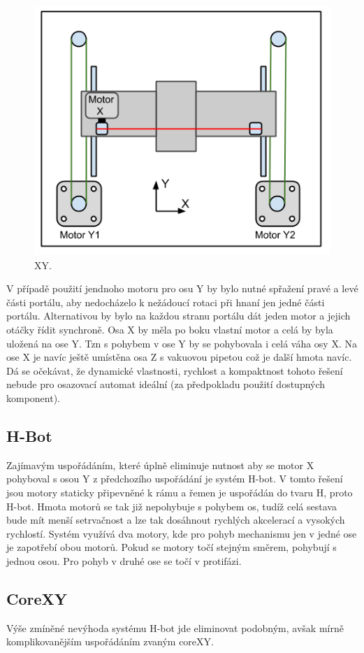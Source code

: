 \begin{figure}[h!]
  \centering
    \includegraphics[width=0.6\linewidth]{obrazky/XY.png}%
    \caption{XY.}
    \label{fig:XY}
\end{figure}


V případě použití jendnoho motoru pro osu Y by bylo nutné spřažení pravé a levé části portálu, aby nedocházelo k nežádoucí rotaci při hnaní jen jedné části portálu. Alternativou by bylo na každou stranu portálu dát jeden motor a jejich otáčky řídit synchroně. 
Osa X by měla po boku vlastní motor a celá by byla uložená na ose Y. Tzn s pohybem v ose Y by se pohybovala i celá váha osy X. Na ose X je navíc ještě umístěna osa Z s vakuovou pipetou což je další hmota navíc. Dá se očekávat, že dynamické vlastnosti, rychlost a kompaktnost tohoto řešení nebude pro osazovací automat ideální (za předpokladu použití dostupných komponent).





\subsection{H-Bot}
Zajímavým uspořádáním, které úplně eliminuje nutnost aby se motor X pohyboval s osou Y z předchozího uspořádání je systém H-bot. V tomto řešení jsou motory staticky připevněné k rámu a řemen je uspořádán do tvaru H, proto H-bot. Hmota motorů se tak již nepohybuje s pohybem os, tudíž celá sestava bude mít menší setrvačnost a lze tak dosáhnout rychlých akcelerací a vysokých rychlostí. Systém využívá dva motory, kde pro pohyb mechanismu jen v jedné ose je zapotřebí obou motorů. Pokud se motory točí stejným směrem, pohybují s jednou osou. Pro pohyb v druhé ose se točí v protifázi.





\subsection{CoreXY}
Výše zmíněné nevýhoda systému H-bot jde eliminovat podobným, avšak mírně komplikovanějším uspořádáním zvaným coreXY. 


